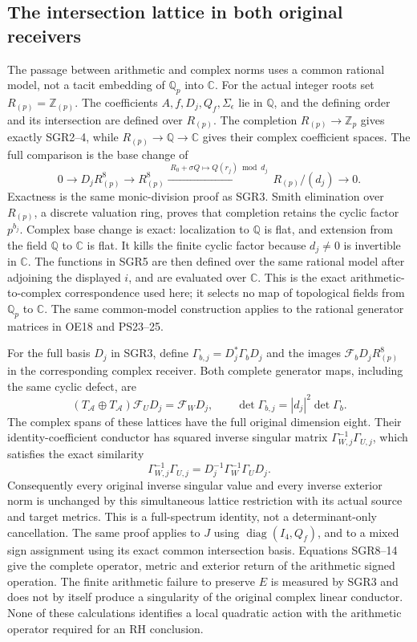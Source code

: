 \documentclass[11pt]{article}
\begin{document}
\subsection{The intersection lattice in both original receivers}
The passage between arithmetic and complex norms uses a common rational
model, not a tacit embedding of $\mathbb Q_p$ into $\mathbb C$.
For the actual integer roots set $R_{(p)}=\mathbb Z_{(p)}$.
The coefficients $A,f,D_j,Q_f,\Sigma_\epsilon$ lie in $\mathbb Q$,
and the defining order and its intersection are defined over $R_{(p)}$.
The completion $R_{(p)}\to\mathbb Z_p$ gives exactly SGR2--4,
while $R_{(p)}\to\mathbb Q\to\mathbb C$ gives their complex
coefficient spaces. The full comparison is the base change of
\[
 0\longrightarrow D_jR_{(p)}^8\longrightarrow R_{(p)}^8
 \xrightarrow{\;R_0+\sigma Q\mapsto Q(r_j)\bmod d_j\;}
 R_{(p)}/(d_j)\longrightarrow0.
 \tag{SGR15}
\]
Exactness is the same monic-division proof as SGR3. Smith elimination
over $R_{(p)}$, a discrete valuation ring, proves that completion
retains the cyclic factor $p^{b_j}$. Complex base change is exact:
localization to $\mathbb Q$ is flat, and extension from the field
$\mathbb Q$ to $\mathbb C$ is flat. It kills the finite cyclic
factor because $d_j\ne0$ is invertible in $\mathbb C$.
The functions in SGR5 are then defined over the same rational model
after adjoining the displayed $i$, and are evaluated over $\mathbb C$.
This is the exact arithmetic-to-complex correspondence used here;
it selects no map of topological fields from $\mathbb Q_p$ to
$\mathbb C$. The same common-model construction applies to the
rational generator matrices in OE18 and PS23--25.

For the full basis $D_j$ in SGR3, define
$\Gamma_{b,j}=D_j^*\Gamma_bD_j$ and the images
$\mathcal F_bD_jR_{(p)}^8$ in the corresponding complex receiver.
Both complete generator maps, including the same cyclic defect, are
\[
 (T_{\mathcal A}\oplus T_{\mathcal A})\mathcal F_UD_j
       =\mathcal F_WD_j,\qquad
 \det\Gamma_{b,j}=|d_j|^2\det\Gamma_b.
 \tag{SGR13}
\]
The complex spans of these lattices have the full original dimension
eight. Their identity-coefficient conductor has squared inverse
singular matrix $\Gamma_{W,j}^{-1}\Gamma_{U,j}$, which satisfies
the exact similarity
\[
 \Gamma_{W,j}^{-1}\Gamma_{U,j}
     =D_j^{-1}\Gamma_W^{-1}\Gamma_UD_j.
 \tag{SGR14}
\]
Consequently every original inverse singular value and every inverse
exterior norm is unchanged by this simultaneous lattice restriction
with its actual source and target metrics. This is a full-spectrum
identity, not a determinant-only cancellation. The same proof applies
to $J$ using $\operatorname{diag}(I_4,Q_f)$, and to a mixed sign
assignment using its exact common intersection basis.
Equations SGR8--14 give the complete operator, metric and exterior
return of the arithmetic signed operation. The finite arithmetic
failure to preserve $E$ is measured by SGR3 and does not by itself
produce a singularity of the original complex linear conductor.
None of these calculations identifies a local quadratic action with
the arithmetic operator required for an RH conclusion.
\end{document}
